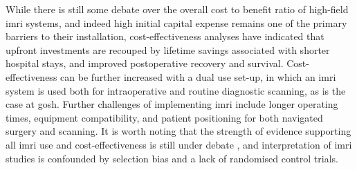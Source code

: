 While there is still some debate over the overall cost to benefit ratio of high-field \gls{imri} systems\autocite{Eljamel2016,Giordano2016a,Giussani2022}, and indeed high initial capital expense remains one of the primary barriers to their installation\autocite{NICE2021}, cost-effectiveness analyses have indicated that upfront investments are recouped by lifetime savings associated with shorter hospital stays, and improved postoperative recovery and survival\autocite{Giordano2016a,Sacino2018}.
Cost-effectiveness can be further increased with a dual use set-up, in which an \gls{imri} system is used both for intraoperative and routine diagnostic scanning\autocite{Giordano2016a}, as is the case at \gls{gosh}.
Further challenges of implementing \gls{imri} include longer operating times, equipment compatibility, and patient positioning for both navigated surgery and scanning\autocite{Giordano2017}.
It is worth noting that the strength of evidence supporting all \gls{imri} use and cost-effectiveness is still under debate \autocite{Jenkinson2018,Garzon-Muvdi2019,Caras2020}, and interpretation of \gls{imri} studies is confounded by selection bias and a lack of randomised control trials\autocite{Kubben2011}.


